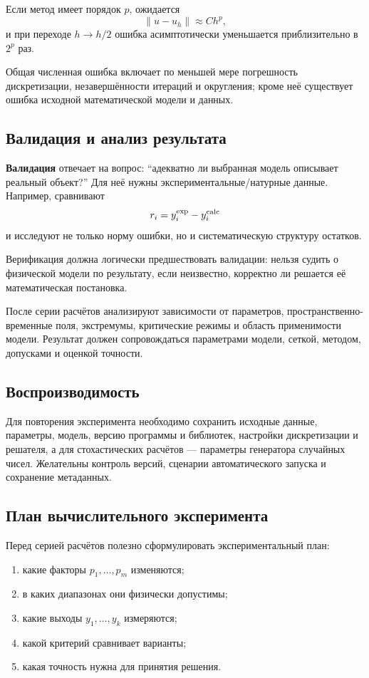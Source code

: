 Если метод имеет порядок $p$, ожидается
\[
\|u-u_h\|\approx Ch^p,
\]
и при переходе $h\to h/2$ ошибка асимптотически уменьшается приблизительно в $2^p$ раз.

Общая численная ошибка включает по меньшей мере погрешность дискретизации, незавершённости итераций и округления; кроме неё существует ошибка исходной математической модели и данных.

\subsection{Валидация и анализ результата}

\textbf{Валидация} отвечает на вопрос: ``адекватно ли выбранная модель описывает реальный объект?'' Для неё нужны экспериментальные/натурные данные. Например, сравнивают
\[
r_i=y_i^{\rm exp}-y_i^{\rm calc}
\]
и исследуют не только норму ошибки, но и систематическую структуру остатков.

Верификация должна логически предшествовать валидации: нельзя судить о физической модели по результату, если неизвестно, корректно ли решается её математическая постановка.

После серии расчётов анализируют зависимости от параметров, пространственно-временные поля, экстремумы, критические режимы и область применимости модели. Результат должен сопровождаться параметрами модели, сеткой, методом, допусками и оценкой точности.

\subsection{Воспроизводимость}

Для повторения эксперимента необходимо сохранить исходные данные, параметры, модель, версию программы и библиотек, настройки дискретизации и решателя, а для стохастических расчётов --- параметры генератора случайных чисел. Желательны контроль версий, сценарии автоматического запуска и сохранение метаданных.


\subsection{План вычислительного эксперимента}

Перед серией расчётов полезно сформулировать экспериментальный план:
\begin{enumerate}
    \item какие факторы $p_1,\ldots,p_m$ изменяются;
    \item в каких диапазонах они физически допустимы;
    \item какие выходы $y_1,\ldots,y_k$ измеряются;
    \item какой критерий сравнивает варианты;
    \item какая точность нужна для принятия решения.
\end{enumerate}

